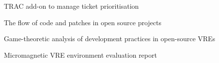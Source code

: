 \begin{workpackage}[id=social-aspects,wphases=0-48,
  title=Social Aspects,
  lead=UO,
  UORM=23,USHRM=8,USORM=6]
\begin{wpdelivs}
\begin{wpdeliv}[due=24,id=social-tracaddon,dissem=PU,nature=OTHER,lead=UO]
{TRAC add-on to manage ticket prioritisation}
\end{wpdeliv}

\begin{wpdeliv}[due=18,id=social-datareport,dissem=PU,nature=R,lead=UO]
{The flow of code and patches in open source projects}
\end{wpdeliv}

\begin{wpdeliv}[due=42,id=social-gametheoretic,dissem=PU,nature=R,lead=UO]
{Game-theoretic analysis of development practices in open-source VREs}
\end{wpdeliv}

 \begin{wpdeliv}[due=48,id=oommf-nb-evaluation,dissem=PU,nature=R,lead=USO]
      {Micromagnetic VRE environment evaluation report}
\end{wpdeliv}
\end{wpdelivs}
\end{workpackage}

